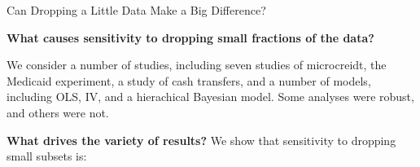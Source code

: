 
\begin{frame}[t]{Can Dropping a Little Data Make a Big Difference?}

\textbf{What causes sensitivity to dropping small fractions of the data?}

\vspace{1em}
We consider a number of studies, including seven studies of microcreidt, the
Medicaid experiment, a study of cash transfers, and a number of models,
including OLS, IV, and a hierachical Bayesian model. Some analyses were robust,
and others were not.

\vspace{1em}
\textbf{What drives the variety of results?}  We show that sensitivity
to dropping small subsets is:



\end{frame}

